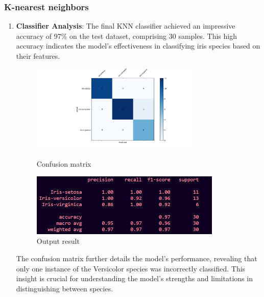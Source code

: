 \documentclass[a4paper]{article}
\begin{document}
\subsubsection{K-nearest neighbors}
\begin{enumerate}
	\item \textbf{Classifier Analysis}: The final KNN classifier achieved an impressive accuracy of 97\% on the test dataset, comprising 30 samples. This high accuracy indicates the model's effectiveness in classifying iris species based on their features.
\begin{figure}[h]
	\begin{minipage}{0.32\textwidth}
	\centering
	\includegraphics[height=4.2cm]{picture/KNN_confusion_matrix} %
	\caption{Confusion matrix}
	\label{fig:setosa}
\end{minipage}\hspace{3cm}
\begin{minipage}{0.32\textwidth}
	\centering
	\includegraphics[height=3cm]{picture/KNN_Classifier_result} %
	\caption{Output result}
	\label{fig:versicolour}
\end{minipage}\hfill
\end{figure}

The confusion matrix further details the model's performance, revealing that only one instance of the Versicolor species was incorrectly classified. This insight is crucial for understanding the model's strengths and limitations in distinguishing between species.


\end{enumerate}
\end{document}
